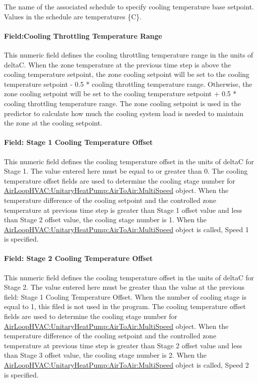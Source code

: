The name of the associated schedule to specify cooling temperature base setpoint. Values in the schedule are temperatures \{C\}.

\paragraph{Field:Cooling Throttling Temperature Range}\label{fieldcooling-throttling-temperature-range}

This numeric field defines the cooling throttling temperature range in the units of deltaC. When the zone temperature at the previous time step is above the cooling temperature setpoint, the zone cooling setpoint will be set to the cooling temperature setpoint - 0.5 * cooling throttling temperature range. Otherwise, the zone cooling setpoint will be set to the cooling temperature setpoint + 0.5 * cooling throttling temperature range. The zone cooling setpoint is used in the predictor to calculate how much the cooling system load is needed to maintain the zone at the cooling setpoint.

\paragraph{Field: Stage 1 Cooling Temperature Offset}\label{field-stage-1-cooling-temperature-offset}

This numeric field defines the cooling temperature offset in the units of deltaC for Stage 1. The value entered here must be equal to or greater than 0. The cooling temperature offset fields are used to determine the cooling stage number for \hyperref[airloophvacunitaryheatpumpairtoairmultispeed]{AirLoopHVAC:UnitaryHeatPump:AirToAir:MultiSpeed} object. When the temperature difference of the cooling setpoint and the controlled zone temperature at previous time step is greater than Stage 1 offset value and less than Stage 2 offset value, the cooling stage number is 1. When the \hyperref[airloophvacunitaryheatpumpairtoairmultispeed]{AirLoopHVAC:UnitaryHeatPump:AirToAir:MultiSpeed} object is called, Speed 1 is specified.

\paragraph{Field: Stage 2 Cooling Temperature Offset}\label{field-stage-2-cooling-temperature-offset}

This numeric field defines the cooling temperature offset in the units of deltaC for Stage 2. The value entered here must be greater than the value at the previous field: Stage 1 Cooling Temperature Offset. When the number of cooling stage is equal to 1, this filed is not used in the program. The cooling temperature offset fields are used to determine the cooling stage number for \hyperref[airloophvacunitaryheatpumpairtoairmultispeed]{AirLoopHVAC:UnitaryHeatPump:AirToAir:MultiSpeed} object. When the temperature difference of the cooling setpoint and the controlled zone temperature at previous time step is greater than Stage 2 offset value and less than Stage 3 offset value, the cooling stage number is 2. When the \hyperref[airloophvacunitaryheatpumpairtoairmultispeed]{AirLoopHVAC:UnitaryHeatPump:AirToAir:MultiSpeed} object is called, Speed 2 is specified.


